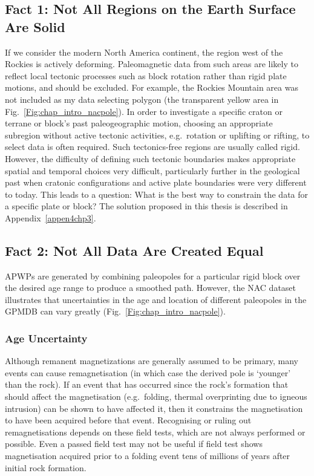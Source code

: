 \subsection{Fact 1: Not All Regions on the Earth Surface Are
Solid}\label{sec:f1}

If we consider the modern North America continent, the region west of the
Rockies is actively deforming. Paleomagnetic data from such areas are likely to
reflect local tectonic processes such as block rotation rather than rigid plate
motions, and should be excluded. For example, the Rockies Mountain area was not
included as my data selecting polygon (the transparent yellow area in
Fig.~\ref{Fig:chap_intro_nacpole}). In order to investigate a specific craton or
terrane or block's past paleogeographic motion, choosing an appropriate
subregion without active tectonic activities, e.g.\ rotation or uplifting or
rifting, to select data is often required. Such tectonics-free regions are
usually called rigid. However, the difficulty of defining such tectonic
boundaries makes appropriate spatial and temporal choices very difficult,
particularly further in the geological past when cratonic configurations and
active plate boundaries were very different to today. This leads to a question:
What is the best way to constrain the data for a specific plate or block? The
solution proposed in this thesis is described in Appendix~\ref{appen4chp3}.

\subsection{Fact 2: Not All Data Are Created Equal}\label{sec:f2}

APWPs are generated by combining paleopoles for a particular rigid block over
the desired age range to produce a smoothed path. However, the NAC dataset
illustrates that uncertainties in the age and location of different paleopoles
in the GPMDB can vary greatly (Fig.~\ref{Fig:chap_intro_nacpole}).

\subsubsection{Age Uncertainty}\label{sec:ageu}

Although remanent magnetizations are generally assumed to be primary, many
events can cause remagnetisation (in which case the derived pole is `younger'
than the rock). If an event that has occurred since the rock's formation that
should affect the magnetisation (e.g.\ folding, thermal overprinting due to
igneous intrusion) can be shown to have affected it, then it constrains the
magnetisation to have been acquired before that event. Recognising or ruling
out remagnetisations depends on these field tests, which are not always
performed or possible. Even a passed field test may not be useful if field test
shows magnetisation acquired prior to a folding event tens of millions of years
after initial rock formation.

